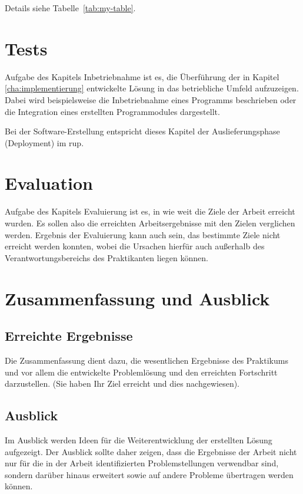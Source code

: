 \documentclass[oneside]{ausarbeitung}
\begin{document}
Details siehe Tabelle~\ref{tab:my-table}.
\chapter{Tests}
\label{cha:tests}

Aufgabe des Kapitels Inbetriebnahme ist es, die Überführung der in 
Kapitel \ref{cha:implementierung} entwickelte Lösung in das betriebliche 
Umfeld aufzuzeigen. Dabei wird beispielsweise die Inbetriebnahme eines 
Programms beschrieben oder die Integration eines erstellten 
Programmodules dargestellt.

Bei der Software-Erstellung entspricht dieses Kapitel der 
Auslieferungsphase (Deployment) im \ac{rup}.

\chapter{Evaluation}
\label{cha:evaluation}
Aufgabe des Kapitels Evaluierung ist es, in wie weit die Ziele der 
Arbeit erreicht wurden. Es sollen also die erreichten Arbeitsergebnisse 
mit den Zielen verglichen werden. Ergebnis der Evaluierung kann auch 
sein, das bestimmte Ziele nicht erreicht werden konnten, wobei die 
Ursachen hierfür auch außerhalb des Verantwortungsbereichs des 
Praktikanten liegen können.

\chapter{Zusammenfassung und Ausblick}
\label{cha:zusammenfassung}

\section{Erreichte Ergebnisse}
\label{sec:ergebnisse}

Die Zusammenfassung dient dazu, die wesentlichen Ergebnisse des 
Praktikums und vor allem die entwickelte Problemlösung und den 
erreichten Fortschritt darzustellen. (Sie haben Ihr Ziel erreicht und 
dies nachgewiesen).

\section{Ausblick}
\label{sec:ausblick}

Im Ausblick werden Ideen für die Weiterentwicklung der erstellten Lösung 
aufgezeigt. Der Ausblick sollte daher zeigen, dass die Ergebnisse der 
Arbeit nicht nur für die in der Arbeit identifizierten Problemstellungen 
verwendbar sind, sondern darüber hinaus erweitert sowie auf andere 
Probleme übertragen werden können.
\end{document}

